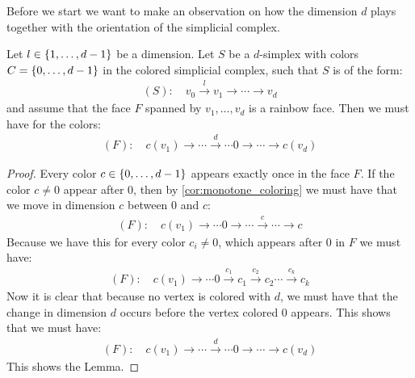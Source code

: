Before we start we want to make an observation on how the dimension $d$ plays together with the orientation of the simplicial complex.
\begin{lemma}
	\label{lem:position_of_d_in_simplex}
	Let $l \in \left\{1, \dots, d-1\right\}$ be a dimension. Let $S$ be a $d$-simplex with colors $C = \left\{0, \dots, d-1\right\}$ in the colored simplicial complex, such that $S$ is of the form:
	\begin{align*}
		(S): \quad v_0 \xrightarrow{l} v_1 \xrightarrow{} \cdots \xrightarrow{} v_d
	\end{align*}
	and assume that the face $F$ spanned by $v_1, \dots, v_d$ is a rainbow face. Then we must have for the colors:
	\begin{align*}
		(F): \quad c(v_1) \xrightarrow{}  \cdots \xrightarrow{d} \cdots  0 \xrightarrow{} \cdots \xrightarrow{} c(v_d)
	\end{align*}
\end{lemma}
\begin{proof}
	Every color $c \in \left\{0, \dots, d-1\right\}$ appears exactly once in the face $F$. If the color $c \neq 0$ appear after $0$, then by \cref{cor:monotone_coloring} we must have that we move in dimension $c$ between $0$ and $c$:
	\begin{align*}
		(F): \quad c(v_1) \xrightarrow{} \cdots  0 \xrightarrow{} \cdots \xrightarrow{c} \cdots \xrightarrow{} c
	\end{align*}
	Because we have this for every color $c_i \neq 0$, which appears after $0$ in $F$ we must have:
	\begin{align*}
		(F): \quad c(v_1) \xrightarrow{} \cdots  0 \xrightarrow{c_1} c_1 \xrightarrow{c_2} c_2 \cdots \xrightarrow{c_k} c_k
	\end{align*}
	Now it is clear that because no vertex is colored with $d$, we must have that the change in dimension $d$ occurs before the vertex colored $0$ appears. This shows that we must have:
	\begin{align*}
		(F): \quad c(v_1) \xrightarrow{}  \cdots \xrightarrow{d} \cdots  0 \xrightarrow{} \cdots \xrightarrow{} c(v_d)
	\end{align*}
	This shows the Lemma.
\end{proof}

